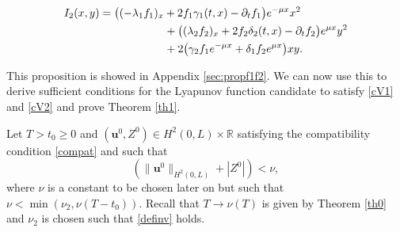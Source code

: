 {\begin{prop}
\begin{equation*}
\begin{split}
I_{2}(x,y)&=\bigl((-\lambda_{1}f_{1})_{x}+2f_{1}\gamma_{1}(t,x)-\partial_{t}f_{1}\bigr)e^{-\mu x}x^{2}\\
&\hspace*{2.06cm}+\bigl((\lambda_{2}f_{2})_{x}+2f_{2}\delta_{2}(t,x)-\partial_{t}f_{2}\bigr)e^{\mu x}y^{2}\\
&\hspace*{2.06cm}+2 \bigl(\gamma_{2}f_{1}e^{-\mu x}+\delta_{1}f_{2}e^{\mu x} \bigr)xy.
\end{split}
\end{equation*}
\end{prop}
This proposition is showed in Appendix \ref{sec:propf1f2}. We can now use this to derive sufficient conditions for the Lyapunov function candidate to satisfy \eqref{cV1} and \eqref{cV2} and prove Theorem \ref{th1}.}

\label{sec:sufficient}
Let $T>{t_{0}\geq0}$ and $(\boldsymbol{u}^{0},Z^{0})\in H^{2}(0,L)\times\mathbb{R}$ satisfying the compatibility condition \eqref{compat} and such that
\begin{equation}
\label{boundu1}
\left(\lVert \boldsymbol{u}^{0}\rVert_{H^{2}(0,L)}+|Z^{0}|\right)<\nu,
\end{equation}
where $\nu$ is a constant to be chosen later on but such that $\nu<\min(\nu_{2},\nu(T-t_{0}))$. Recall that ${T\to \nu(T)}$ is given by Theorem \ref{th0} {and $\nu_{2}$ is chosen such that \eqref{definv} holds}.

